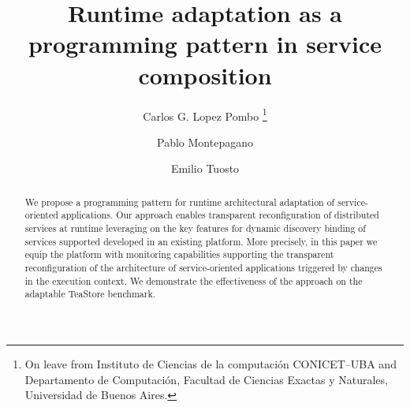 \documentclass{llncs}
\title{%
  Runtime adaptation as a programming pattern in service composition
}
\author{Carlos G. Lopez Pombo
	\thanks{On leave from Instituto de Ciencias de la computaci\'on CONICET--UBA and Departamento de Computación, Facultad de Ciencias Exactas y Naturales, Universidad de Buenos Aires.}\inst{1}\raisebox{.6em}{\orcidlink{0000-0002-0248-5019}} \and Pablo Montepagano\inst{2} \and Emilio Tuosto\inst{3}\raisebox{.6em}{\orcidlink{0000-0002-7032-3281}}
}
\institute{%
  Centro Interdisciplinario de Telecomunicaciones, Electrónica,
  Computación y Ciencia Aplicada, Universidad Nacional de
  Río Negro - Sede Andina and CONICET. %
  \and 
  Departamento de Computaci\'on, Facultad de Ciencias Exactas y Naturales, Universidad de Buenos Aires. %
  \and
  Gran Sasso Science Institute %
}
\newcommand\SEArchLogo{\textcolor{\toolidcol}{\hw{SEArch}}\xspace}
\begin{document}


\maketitle

\begin{abstract}



  
  We propose a programming pattern for runtime architectural
  adaptation of service-oriented applications.
  Our approach enables transparent reconfiguration of distributed
  services at runtime leveraging on the key features for dynamic
  discovery binding of services supported developed in an existing
  platform.
  More precisely, in this paper we equip the platform with monitoring
  capabilities supporting the transparent reconfiguration of the
  architecture of service-oriented applications triggered by changes
  in the execution context.
  We demonstrate the effectiveness of the approach on the
  adaptable TeaStore benchmark.
\end{abstract}
\end{document}
